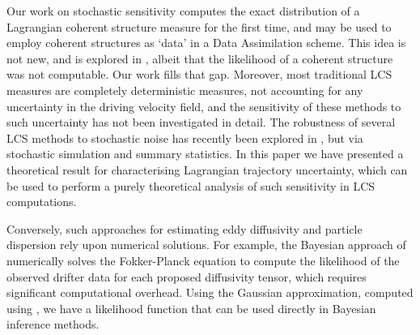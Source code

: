 Our work on stochastic sensitivity computes the exact distribution of a Lagrangian coherent structure measure for the first time, and may be used to employ coherent structures as `data' in a Data Assimilation scheme. This idea is not new, and is explored in \cite{MacleanEtAl_2017_CoherentStructureApproach,MorzfeldEtAl_2018_FeaturebasedDataAssimilation,Schlueter-KuckDabiri_2019_ModelParameterEstimation}, albeit that the likelihood of a coherent structure was not computable. Our work fills that gap.
Moreover, most traditional LCS measures are completely deterministic measures, not accounting for any uncertainty in the driving velocity field, and the sensitivity of these methods to such uncertainty has not been investigated in detail.
The robustness of several LCS methods to stochastic noise has recently been explored in \cite{BadzaEtAl_2023_HowSensitiveAre}, but via stochastic simulation and summary statistics.
In this paper we have presented a theoretical result for characterising Lagrangian trajectory uncertainty, which can be used to perform a purely theoretical analysis of such sensitivity in LCS computations.

Conversely, such approaches for estimating eddy diffusivity and particle dispersion rely upon numerical solutions.
For example, the Bayesian approach of \cite{YingEtAl_2019_BayesianInferenceOcean} numerically solves the Fokker-Planck equation to compute the likelihood of the observed drifter data for each proposed diffusivity tensor, which requires significant computational overhead.
Using the Gaussian approximation, computed using , we have a likelihood function that can be used directly in Bayesian inference methods.




